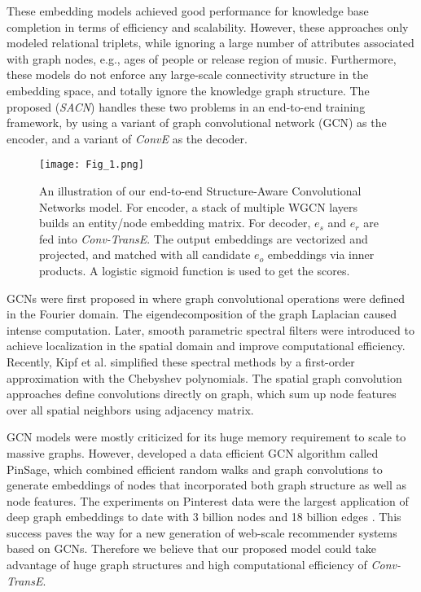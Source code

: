 \documentclass[letterpaper]{article} \usepackage{aaai19}  \usepackage{times}  \usepackage{helvet}  \usepackage{courier}  \usepackage{url}  \usepackage{graphicx}  \usepackage{amsmath}
\begin{document}
These embedding models achieved good performance for knowledge base completion in terms of efficiency and scalability. However, these approaches only modeled relational triplets, while ignoring a large number of attributes associated with graph nodes, e.g., ages of people or release region of music.
Furthermore, these models do not enforce any large-scale connectivity structure in the embedding space, and totally ignore the knowledge graph structure. The proposed ({\it SACN}) handles these two problems in an end-to-end training framework, by using a variant of graph convolutional network (GCN) as the encoder, and a variant of {\it ConvE} as the decoder.

\begin{figure*}
    \texttt{[image: Fig\_1.png]}
    \caption{An illustration of our end-to-end Structure-Aware Convolutional Networks model. For encoder, a stack of multiple WGCN layers builds an entity/node embedding matrix. For decoder, $e_s$ and $e_r$ are fed into {\it Conv-TransE}. The output embeddings are vectorized and projected, and matched with all candidate $e_o$ embeddings via inner products. A logistic sigmoid function is used to get the scores.
    }
    \medskip
\label{fig:structure}
\end{figure*}

GCNs were first proposed in \cite{bruna2013spectral} where graph convolutional operations were defined in the Fourier domain. The eigendecomposition of the graph Laplacian caused intense computation. Later, smooth parametric spectral filters \cite{henaff2015deep,defferrard2016convolutional} were introduced to achieve localization in the spatial domain and improve computational efficiency.
Recently, Kipf et al. \cite{kipf2016semi} simplified these spectral methods by a first-order approximation with the Chebyshev polynomials. 
The spatial graph convolution approaches \cite{hamilton2017inductive} define convolutions directly on graph, which sum up node features over all spatial neighbors using adjacency matrix.


GCN models were mostly criticized for its huge memory requirement to scale to massive graphs. However, \cite{ying2018kdd} developed a data efficient GCN algorithm called PinSage, which combined efficient random walks and graph convolutions to generate embeddings of nodes that incorporated both graph structure as well as node features. The experiments on Pinterest data were the largest application of deep graph embeddings to date with 3 billion nodes and 18 billion edges \cite{ying2018kdd}. This success paves the way for a new generation of web-scale recommender systems based on GCNs. Therefore we believe that our proposed model could take advantage of huge graph structures and high computational efficiency of {\it Conv-TransE}.
\end{document}
